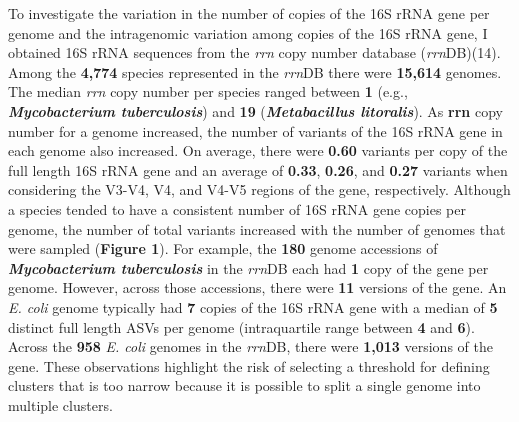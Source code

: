 \documentclass[
]{article}
\begin{document}
To investigate the variation in the number of copies of the 16S rRNA
gene per genome and the intragenomic variation among copies of the 16S
rRNA gene, I obtained 16S rRNA sequences from the \emph{rrn} copy number
database (\emph{rrn}DB)(14). Among the \textbf{4,774} species
represented in the \emph{rrn}DB there were \textbf{15,614} genomes. The
median \emph{rrn} copy number per species ranged between \textbf{1}
(e.g., \textbf{\emph{Mycobacterium tuberculosis}}) and \textbf{19}
(\textbf{\emph{Metabacillus litoralis}}). As \textbf{rrn} copy number
for a genome increased, the number of variants of the 16S rRNA gene in
each genome also increased. On average, there were \textbf{0.60}
variants per copy of the full length 16S rRNA gene and an average of
\textbf{0.33}, \textbf{0.26}, and \textbf{0.27} variants when
considering the V3-V4, V4, and V4-V5 regions of the gene, respectively.
Although a species tended to have a consistent number of 16S rRNA gene
copies per genome, the number of total variants increased with the
number of genomes that were sampled (\textbf{Figure 1}). For example,
the \textbf{180} genome accessions of \textbf{\emph{Mycobacterium
tuberculosis}} in the \emph{rrn}DB each had \textbf{1} copy of the gene
per genome. However, across those accessions, there were \textbf{11}
versions of the gene. An \emph{E. coli} genome typically had \textbf{7}
copies of the 16S rRNA gene with a median of \textbf{5} distinct full
length ASVs per genome (intraquartile range between \textbf{4} and
\textbf{6}). Across the \textbf{958} \emph{E. coli} genomes in the
\emph{rrn}DB, there were \textbf{1,013} versions of the gene. These
observations highlight the risk of selecting a threshold for defining
clusters that is too narrow because it is possible to split a single
genome into multiple clusters.
\end{document}
